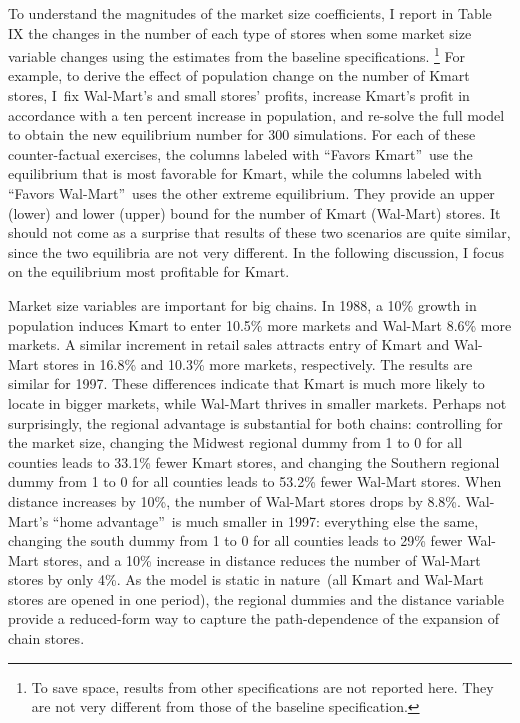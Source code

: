 \documentclass[notitlepage,onecolumn,11pt]{article}
\begin{document}
To understand the magnitudes of the market size coefficients, I report in
Table IX the changes in the number of each type of stores when some market
size variable changes using the estimates from the baseline specifications.%
\footnote{%
To save space, results from other specifications are not reported here. They
are not very different from those of the baseline specification.} For
example, to derive the effect of population change on the number of Kmart
stores, I\ fix Wal-Mart's and small stores' profits, increase Kmart's profit
in accordance with a ten percent increase in population, and re-solve the
full model to obtain the new equilibrium number for 300 simulations. For
each of these counter-factual exercises, the columns labeled with
\textquotedblleft Favors Kmart\textquotedblright\ use the equilibrium that
is most favorable for Kmart, while the columns labeled with
\textquotedblleft Favors Wal-Mart\textquotedblright\ uses the other extreme
equilibrium. They provide an upper (lower) and lower (upper) bound for the
number of Kmart (Wal-Mart) stores. It should not come as a surprise that
results of these two scenarios are quite similar, since the two equilibria
are not very different. In the following discussion, I focus on the
equilibrium most profitable for Kmart.

Market size variables are important for big chains. In 1988, a 10\% growth
in population induces Kmart to enter 10.5\% more markets and Wal-Mart 8.6\%
more markets. A similar increment in retail sales attracts entry of Kmart
and Wal-Mart stores in 16.8\% and 10.3\% more markets, respectively. The
results are similar for 1997. These differences indicate that Kmart is much
more likely to locate in bigger markets, while Wal-Mart thrives in smaller
markets. Perhaps not surprisingly, the regional advantage is substantial for
both chains: controlling for the market size, changing the Midwest regional
dummy from 1 to 0 for all counties leads to 33.1\% fewer Kmart stores, and
changing the Southern regional dummy from 1 to 0 for all counties leads to
53.2\% fewer Wal-Mart stores. When distance increases by 10\%, the number of
Wal-Mart stores drops by 8.8\%. Wal-Mart's \textquotedblleft home
advantage\textquotedblright\ is much smaller in 1997: everything else the
same, changing the south dummy from 1 to 0 for all counties leads to 29\%
fewer Wal-Mart stores, and a 10\% increase in distance reduces the number of
Wal-Mart stores by only 4\%. As the model is static in nature\ (all Kmart
and Wal-Mart stores are opened in one period), the regional dummies and the
distance variable provide a reduced-form way to capture the path-dependence
of the expansion of chain stores.
\end{document}
